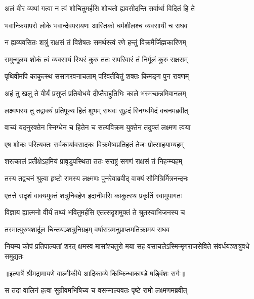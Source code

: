 \twolineshloka
{अलं वीर व्यथां गत्वा न त्वं शोचितुमर्हसि}
{शोचतो ह्यवसीदन्ति सर्वार्था विदितं हि ते} %

\twolineshloka
{भवान्क्रियापरो लोके भवान्देवपरायणः}
{आस्तिको धर्मशीलश्च व्यवसायी च राघव} %

\twolineshloka
{न ह्यव्यवसितः शत्रुं राक्षसं तं विशेषतः}
{समर्थस्त्वं रणे हन्तुं विक्रमैर्जिह्मकारिणम्} %

\twolineshloka
{समुन्मूलय शोकं त्वं व्यवसायं स्थिरं कुरु}
{ततः सपरिवारं तं निर्मूलं कुरु राक्षसम्} %

\twolineshloka
{पृथिवीमपि काकुत्स्थ ससागरवनाचलाम्}
{परिवर्तयितुं शक्तः किमङ्ग पुन रावणम्} %

\twolineshloka
{अहं तु खलु ते वीर्यं प्रसुप्तं प्रतिबोधये}
{दीप्तैराहुतिभिः काले भस्मच्छन्नमिवानलम्} %

\twolineshloka
{लक्ष्मणस्य तु तद्वाक्यं प्रतिपूज्य हितं शुभम्}
{राघवः सुहृदं स्निग्धमिदं वचनमब्रवीत्} %

\twolineshloka
{वाच्यं यदनुरक्तेन स्निग्धेन च हितेन च}
{सत्यविक्रम युक्तेन तदुक्तं लक्ष्मण त्वया} %

\twolineshloka
{एष शोकः परित्यक्तः सर्वकार्यावसादकः}
{विक्रमेष्वप्रतिहतं तेजः प्रोत्साहयाम्यहम्} %

\twolineshloka
{शरत्कालं प्रतीक्षेऽहमियं प्रावृडुपस्थिता}
{ततः सराष्ट्रं सगणं राक्षसं तं निहन्म्यहम्} %

\twolineshloka
{तस्य तद्वचनं श्रुत्वा हृष्टो रामस्य लक्ष्मणः}
{पुनरेवाब्रवीद् वाक्यं सौमित्रिर्मित्रनन्दनः} %

\twolineshloka
{एतत्ते सदृशं वाक्यमुक्तं शत्रुनिबर्हण}
{इदानीमसि काकुत्स्थ प्रकृतिं स्वामुपागतः} %

\twolineshloka
{विज्ञाय ह्यात्मनो वीर्यं तथ्यं भवितुमर्हसि}
{एतत्सदृशमुक्तं ते श्रुतस्याभिजनस्य च} %

\twolineshloka
{तस्मात्पुरुषशार्दूल चिन्तयञ्शत्रुनिग्रहम्}
{वर्षारात्रमनुप्राप्तमतिक्रामय राघव} %

\fourlineindentedshloka
{नियम्य कोपं प्रतिपाल्यतां शरत्}
{क्षमस्व मासांश्चतुरो मया सह}
{वसाचलेऽस्मिन्मृगराजसेविते}
{संवर्धयञ्शत्रुवधे समुद्यतः} %


{॥इत्यार्षे श्रीमद्रामायणे वाल्मीकीये आदिकाव्ये किष्किन्धाकाण्डे षड्विंशः सर्गः॥}


\twolineshloka
{स तदा वालिनं हत्वा सुग्रीवमभिषिच्य च}
{वसन्माल्यवतः पृष्टे रामो लक्ष्मणमब्रवीत्} %

